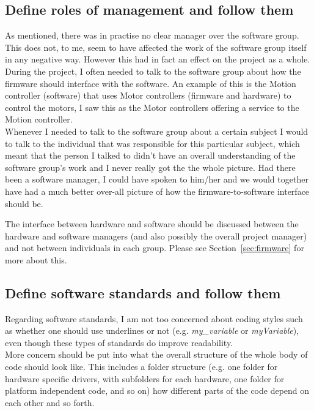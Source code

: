 \subsection{Define roles of management and follow them}\label{sec:roles}
As mentioned, there was in practise no clear manager over the software group. This does not, to me, seem to have affected the work of the software group itself in any negative way. However this had in fact an effect on the project as a whole. \\
During the project, I often needed to talk to the software group about how the firmware should interface with the software. An example of this is the Motion controller (software) that uses Motor controllers (firmware and hardware) to control the motors, I saw this as the Motor controllers offering a service to the Motion controller. \\
Whenever I needed to talk to the software group about a certain subject I would to talk to the individual that was responsible for this particular subject, which meant that the person I talked to didn't have an overall understanding of the software group's work and I never really got the the whole picture. Had there been a software manager, I could have spoken to him/her and we would together have had a much better over-all picture of how the firmware-to-software interface should be.

The interface between hardware and software should be discussed between the hardware and software managers (and also  possibly the overall project manager) and not between individuals in each group. Please see Section~\ref{sec:firmware} for more about this.


\subsection{Define software standards and follow them}\label{sec:software_standards}
Regarding software standards, I am not too concerned about coding styles such as whether one should use underlines or not (e.g. \emph{my\_variable} or \emph{myVariable}), even though these types of standards do improve readability. \\
More concern should be put into what the overall structure of the whole body of code should look like. This includes a folder structure (e.g. one folder for hardware specific drivers, with subfolders for each hardware, one folder for platform independent code, and so on) how different parts of the code depend on each other and so forth.

